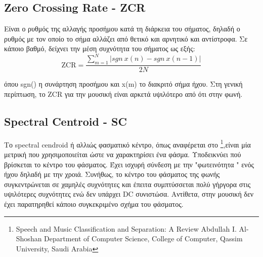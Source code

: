 
\subsection{Zero Crossing Rate - ZCR}

Είναι ο ρυθμός της αλλαγής προσήμου κατά τη διάρκεια του σήματος, δηλαδή ο ρυθμός με τον οποίο το σήμα αλλάζει από θετικό και αρνητικό και αντίστροφα. Σε κάποιο βαθμό, δείχνει την μέση συχνότητα του σήματος ως εξής:
\begin{equation}
\text{ZCR} = \frac{\sum_{m=1}^{N} |sgn ~x(n) - sgn~x(n-1)| }{2N}
\end{equation}

όπου sgn() η συνάρτηση προσήμου και x(m) το διακριτό σήμα ήχου. Στη γενική περίπτωση, το ZCR για την μουσική είναι αρκετά υψιλότερο από ότι στην φωνή.


\subsection{Spectral Centroid - SC}

Το spectral cendroid ή αλλιώς φασματικό κέντρο, όπως αναφέρεται στο \footnote{
Speech and Music Classification and Separation: A Review 
Abdullah I. Al-Shoshan
Department of Computer Science, College of Computer, 
Qassim University, Saudi Arabia },είναι μία μετρική που χρησιμοποιείται ώστε να χαρακτηρίσει ένα φάσμα. Υποδεικνύει πού βρίσκεται το κέντρο του φάσματος. Έχει ισχυρή σύνδεση με την "φωτεινότητα " ενός ήχου δηλαδή με την χροιά. Συνήθως, το κέντρο του φάσματος της φωνής συγκεντρώνεται σε χαμηλές συχνότητες και έπειτα συμπτύσσεται πολύ γήργορα στις υψιλότερες συχνότητες ενώ δεν υπάρχει DC συνιστώσα. Αντίθετα, στην μουσική δεν έχει παρατηρηθεί κάποιο συγκεκριμένο σχήμα του φάσματος. 
